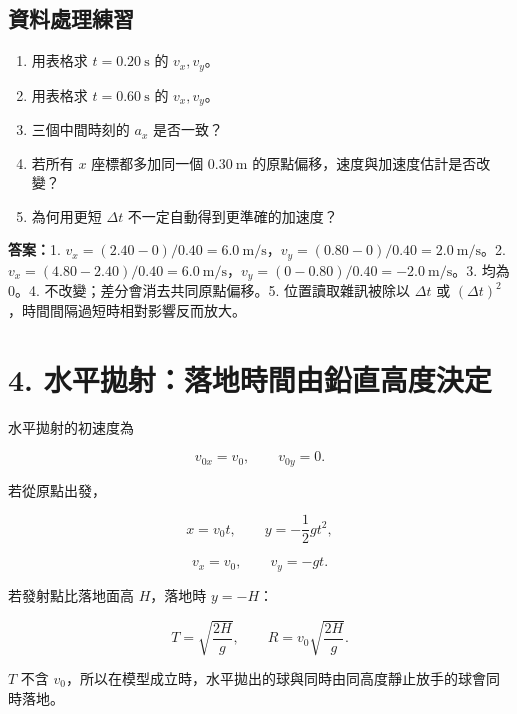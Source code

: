\documentclass[11pt,a4paper]{article}
\providecommand{\tightlist}{%
  \setlength{\itemsep}{0pt}\setlength{\parskip}{0pt}}
\begin{document}
\begin{HandoutSelfCheck}

\subsection{資料處理練習}\label{ux8cc7ux6599ux8655ux7406ux7df4ux7fd2}

\begin{enumerate}
\def\labelenumi{\arabic{enumi}.}
\tightlist
\item
  用表格求 \(t=0.20\ \mathrm s\) 的 \(v_x,v_y\)。
\item
  用表格求 \(t=0.60\ \mathrm s\) 的 \(v_x,v_y\)。
\item
  三個中間時刻的 \(a_x\) 是否一致？
\item
  若所有 \(x\) 座標都多加同一個 \(0.30\ \mathrm m\) 的原點偏移，速度與加速度估計是否改變？
\item
  為何用更短 \(\Delta t\) 不一定自動得到更準確的加速度？
\end{enumerate}

\textbf{答案：}1. \(v_x=(2.40-0)/0.40=6.0\ \mathrm{m/s}\)，\(v_y=(0.80-0)/0.40=2.0\ \mathrm{m/s}\)。2. \(v_x=(4.80-2.40)/0.40=6.0\ \mathrm{m/s}\)，\(v_y=(0-0.80)/0.40=-2.0\ \mathrm{m/s}\)。3. 均為 0。4. 不改變；差分會消去共同原點偏移。5. 位置讀取雜訊被除以 \(\Delta t\) 或 \((\Delta t)^2\)，時間間隔過短時相對影響反而放大。

\end{HandoutSelfCheck}

\section{4. 水平拋射：落地時間由鉛直高度決定}\label{ux6c34ux5e73ux62cbux5c04ux843dux5730ux6642ux9593ux7531ux925bux76f4ux9ad8ux5ea6ux6c7aux5b9a}

水平拋射的初速度為

\[
v_{0x}=v_0,
\qquad
v_{0y}=0.
\]

若從原點出發，

\[
\boxed{x=v_0t},
\qquad
\boxed{y=-\frac12gt^2},
\]

\[
v_x=v_0,
\qquad
v_y=-gt.
\]

若發射點比落地面高 \(H\)，落地時 \(y=-H\)：

\[
\boxed{T=\sqrt{\frac{2H}{g}}},
\qquad
\boxed{R=v_0\sqrt{\frac{2H}{g}}}.
\]

\(T\) 不含 \(v_0\)，所以在模型成立時，水平拋出的球與同時由同高度靜止放手的球會同時落地。
\end{document}
